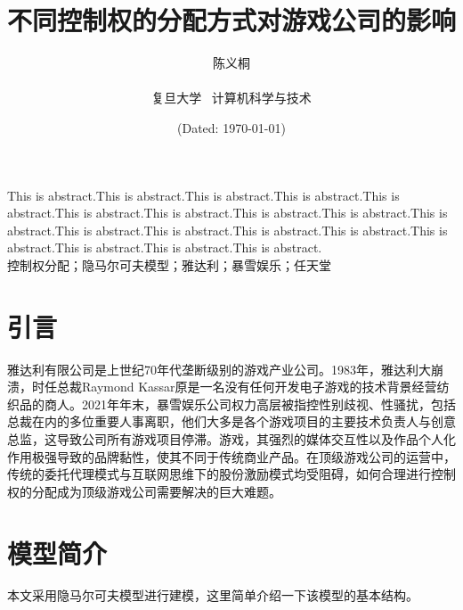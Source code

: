 \documentclass[hyperref]{ctexart}
\title{\textbf{不同控制权的分配方式对游戏公司的影响}}
\author{\sffamily 陈义桐 \\ \\复旦大学 \ 计算机科学与技术}
\date{(Dated: \today)}
\begin{document}
	\maketitle
		This is abstract.This is abstract.This is abstract.This is abstract.This is abstract.This is abstract.This is abstract.This is abstract.This is abstract.This is abstract.This is abstract.This is abstract.This is abstract.This is abstract.This is abstract.This is abstract.This is abstract.This is abstract.\\
		
		控制权分配；隐马尔可夫模型；雅达利；暴雪娱乐；任天堂
	\begin{multicols}{2}
	\section{引言}
	雅达利有限公司是上世纪70年代垄断级别的游戏产业公司。1983年，雅达利大崩溃，时任总裁Raymond Kassar原是一名没有任何开发电子游戏的技术背景经营纺织品的商人。2021年年末，暴雪娱乐公司权力高层被指控性别歧视、性骚扰，包括总裁在内的多位重要人事离职，他们大多是各个游戏项目的主要技术负责人与创意总监，这导致公司所有游戏项目停滞。游戏，其强烈的媒体交互性以及作品个人化作用极强导致的品牌黏性，使其不同于传统商业产品。在顶级游戏公司的运营中，传统的委托代理模式与互联网思维下的股份激励模式均受阻碍，如何合理进行控制权的分配成为顶级游戏公司需要解决的巨大难题。
	\section{模型简介}
	本文采用隐马尔可夫模型进行建模，这里简单介绍一下该模型的基本结构。

\end{multicols}
\end{document}
